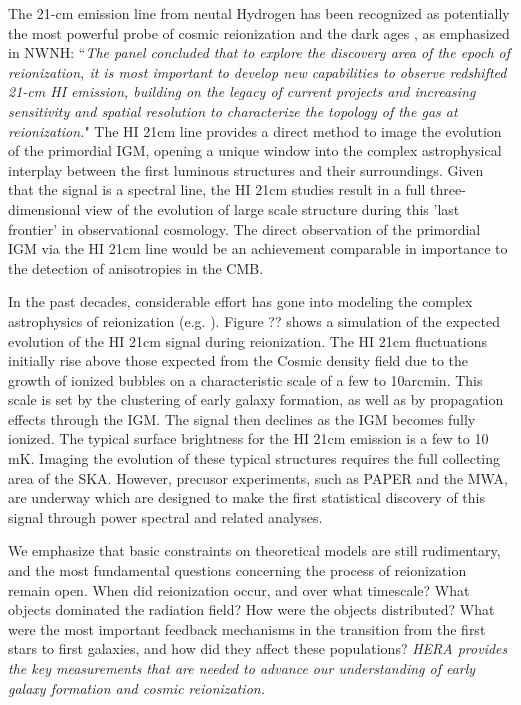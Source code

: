 \documentclass[preprint]{aastex}
\def\HI{{H{\small I }}}
\begin{document}
The 21-cm emission line from neutal Hydrogen has been recognized as
potentially the most powerful probe of cosmic reionization and 
the dark ages \citep{morales_wyithe2010,
furlanetto_et_al2006}, as emphasized in NWNH: ``{\it The panel
concluded that to explore the discovery area of the epoch of
reionization, it is most important to develop new capabilities to
observe redshifted 21-cm \HI emission, building on the legacy of
current projects and increasing sensitivity and spatial resolution to
characterize the topology of the gas at reionization.}"  The HI 21cm
line provides a direct method to image the evolution of the primordial
IGM, opening a unique window into the complex astrophysical
interplay between the first luminous structures and their
surroundings. Given that the signal is a spectral line, the HI 21cm
studies result in a full three-dimensional view of the evolution of
large scale structure during this 'last frontier' in observational
cosmology. The direct observation of the primordial IGM via
the HI 21cm line would be an achievement comparable in importance to
the detection of anisotropies in the CMB.

In the past decades, considerable effort has gone into modeling the
complex astrophysics of reionization
(e.g. \citealt{shapiro_giroux1987, haiman_loeb1997,
furlanetto_et_al2004, santos_et_al2010}). Figure ?? shows a simulation
of the expected evolution of the HI 21cm signal during
reionization. The HI 21cm fluctuations initially rise above those
expected from the Cosmic density field due to the growth of ionized
bubbles on a characteristic scale of a few to 10arcmin. This scale is
set by the clustering of early galaxy formation, as well as by
propagation effects through the IGM. The signal then declines as the
IGM becomes fully ionized.  The typical surface brightness for the HI
21cm emission is a few to 10 mK.  Imaging the evolution of these
typical structures requires the full collecting area of the
SKA. However, precusor experiments, such as PAPER and the MWA, are
underway which are designed to make the first statistical discovery of
this signal through power spectral and related analyses.

We emphasize that basic constraints on theoretical models are still
rudimentary, and the most fundamental questions concerning the process
of reionization remain open.  When did reionization occur, and over
what timescale?  What objects dominated the radiation field?  How were
the objects distributed?  What were the most important feedback
mechanisms in the transition from the first stars to first galaxies,
and how did they affect these populations?  {\it HERA provides the key
measurements that are needed to advance our understanding of early
galaxy formation and cosmic reionization.}
\end{document}
